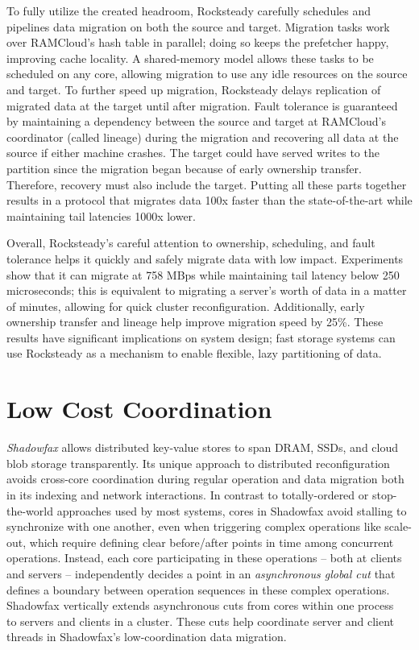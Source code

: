 To fully utilize the created headroom, Rocksteady carefully schedules and
pipelines data migration on both the source and target.
%
Migration tasks work over RAMCloud’s hash table in parallel;
doing so keeps the prefetcher happy, improving cache locality.
%
A shared-memory model allows these tasks to be scheduled on any core,
allowing migration to use any idle resources on the source and target.
%
To further speed up migration, Rocksteady delays
replication of migrated data at the target until after migration.
%
Fault tolerance is guaranteed by maintaining a dependency
between the source and target at RAMCloud’s coordinator (called lineage)
during the migration and recovering all data at the source if either
machine crashes.
%
%
The target could have served writes
to the partition since the migration began because of early
ownership transfer.
%
Therefore, recovery must also include the target.
%
Putting all these parts
together results in a protocol that migrates data 100x faster than the
state-of-the-art while maintaining tail latencies 1000x lower.

Overall, Rocksteady's careful attention to ownership, scheduling, and
fault tolerance helps it quickly and safely migrate data with
low impact.
%
Experiments show that it can migrate at 758 MBps
while maintaining tail latency below 250 microseconds; this is
equivalent to migrating a server's worth of data in a matter of minutes,
allowing for quick cluster reconfiguration.
%
Additionally, early ownership transfer and
lineage help improve migration speed by 25\%.
%
These results have
significant implications on system design; fast storage systems can use
Rocksteady as a mechanism to enable flexible, lazy partitioning of
data.

\section{Low Cost Coordination}

\emph{Shadowfax} allows distributed key-value stores to
span DRAM, SSDs, and cloud blob storage transparently.
%
Its unique approach to
distributed reconfiguration avoids cross-core coordination during
regular operation and data migration both in its indexing and network
interactions.
%
In contrast to totally-ordered or stop-the-world approaches used by most
systems, cores in Shadowfax avoid stalling to synchronize with one another, even when
triggering complex operations like scale-out, which require
defining clear before/after points in time among concurrent operations.
%
Instead, each core participating in these operations -- both at clients and
servers -- independently decides a point in an \emph{asynchronous global
cut} that defines a boundary between operation sequences in these complex operations.
%
Shadowfax vertically extends asynchronous cuts from cores within one
process~\cite{faster} to servers
and clients in a cluster.
%
These cuts help coordinate server
and client threads
in Shadowfax's low-coordination data migration.

